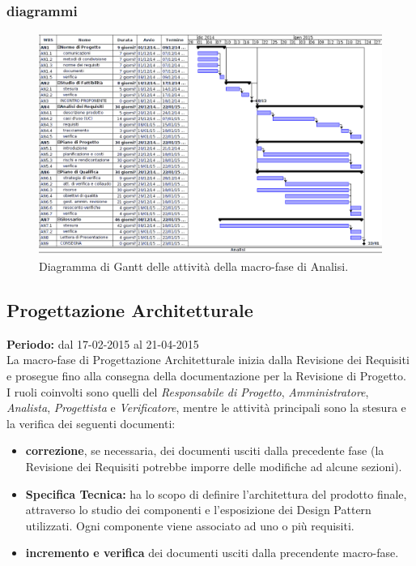 \newpage
\subsubsection{diagrammi}

\begin{figure}[h]
\begin{center}
\includegraphics[width=\textwidth, height=\textheight, keepaspectratio]{img/analisi-gantt.png}
\caption{Diagramma di Gantt delle attività della macro-fase di Analisi.}
\end{center}
\end{figure}
\clearpage

\subsection{Progettazione Architetturale}
\textbf{Periodo:} dal 17-02-2015 al 21-04-2015 \\
La macro-fase di Progettazione Architetturale inizia dalla Revisione dei Requisiti e prosegue fino alla consegna della documentazione per la Revisione di Progetto. \\
I ruoli coinvolti sono quelli del \textit{Responsabile di Progetto}, \textit{Amministratore}, \textit{Analista}, \textit{Progettista} e \textit{Verificatore}, mentre le attività principali sono la stesura e la verifica dei seguenti documenti:

\begin{itemize}
\item \textbf{correzione}, se necessaria, dei documenti usciti dalla precedente fase (la Revisione dei Requisiti potrebbe imporre delle modifiche ad alcune sezioni).
\item \textbf{Specifica Tecnica:} ha lo scopo di definire l'architettura del prodotto finale,  attraverso lo studio dei componenti e l'esposizione dei Design Pattern utilizzati. Ogni componente viene associato ad uno o più requisiti.
\item \textbf{incremento e verifica} dei documenti usciti dalla precendente macro-fase.
\end{itemize}

